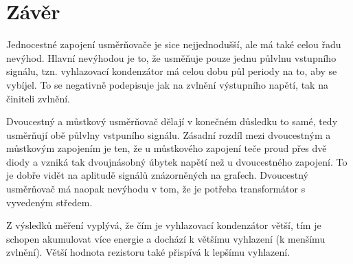\documentclass[12pt]{article} %
\begin{document}
\section{Závěr}
Jednocestné zapojení usměrňovače je sice nejjednodušší, ale má také celou řadu nevýhod. Hlavní nevýhodou je to, že usměňuje pouze jednu půlvlnu vstupního signálu, tzn. vyhlazovací kondenzátor má celou dobu půl periody na to, aby se vybíjel. To se negativně podepisuje jak na zvlnění výstupního napětí, tak  na činiteli zvlnění.

Dvoucestný a můstkový usměrňovač dělají v konečném důsledku to samé, tedy usměrňují obě půlvlny vstpuního signálu. Zásadní rozdíl mezi dvoucestným a můstkovým zapojením je ten, že u můstkového zapojení teče proud přes dvě diody a vzniká tak dvoujnásobný úbytek napětí než u dvoucestného zapojení. To je dobře vidět na aplitudě signálů znázorněných na grafech. Dvoucestný usměrňovač má naopak nevýhodu v tom, že je potřeba transformátor s vyvedeným středem.

Z výsledků měření vyplývá, že čím je vyhlazovací kondenzátor větší, tím je schopen akumulovat více energie a dochází k většímu vyhlazení (k menšímu zvlnění). Větší hodnota rezistoru také přispívá k lepšímu vyhlazení.
\end{document}
